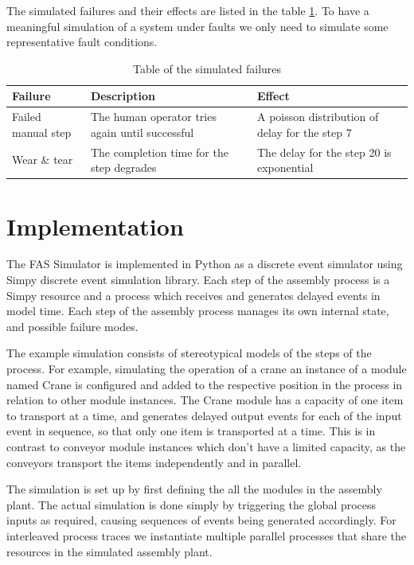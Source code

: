 \documentclass[procedia]{easychair}
\begin{document}
The simulated failures and their effects are listed in the table \ref{failures}.
To have a meaningful simulation of a system under faults we only need to simulate some representative fault conditions.

\begin{table}[!t]
\tiny
\renewcommand{\arraystretch}{1.3}
\caption{Table of the simulated failures}
\label{failures}
\centering
\begin{tabular}{|p{40mm}|p{40mm}|p{50mm}|}
\hline
Failure & Description & Effect \\
\hline
\hline
Failed manual step & The human operator tries again until successful & A poisson distribution of delay for the step 7 \\
\hline
Wear \& tear & The completion time for the step degrades & The delay for the step 20 is exponential \\
\hline
\end{tabular}
\end{table}

\section{Implementation}

The FAS Simulator\cite{FASSimulator} is implemented in Python as a discrete event simulator using Simpy discrete event simulation library.
Each step of the assembly process is a Simpy resource and a process which receives and generates
delayed events in model time. Each step of the assembly process manages its own internal state, and possible failure modes.

The example simulation consists of stereotypical models of the steps of the process. For example, simulating
the operation of a crane an instance of a module named Crane is configured and added to the respective position in the process in relation to other module instances.
The Crane module has a capacity of one item to transport at a time, and generates delayed output events for each of the input event in sequence, so that only one item is
transported at a time. This is in contrast to conveyor module instances which don't have a limited capacity, as the conveyors transport the items independently and in parallel.

The simulation is set up by first defining the all the modules in the assembly plant. The actual simulation
is done simply by triggering the global process inputs as required, causing sequences of events being generated accordingly. For interleaved process traces we instantiate multiple
parallel processes that share the resources in the simulated assembly plant.
\end{document}

